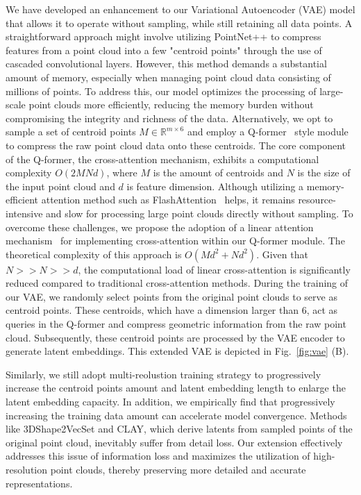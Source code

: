 We have developed an enhancement to our Variational Autoencoder (VAE) model that allows it to operate without sampling, while still retaining all data points. A straightforward approach might involve utilizing PointNet++ \cite{qi2017pointnet++} to compress features from a point cloud into a few "centroid points" through the use of cascaded convolutional layers. However, this method demands a substantial amount of memory, especially when managing point cloud data consisting of millions of points. To address this, our model optimizes the processing of large-scale point clouds more efficiently, reducing the memory burden without compromising the integrity and richness of the data.
Alternatively, we opt to sample a set of centroid points  $M \in \mathbb{R}^{m \times 6}$ and employ a Q-former~\cite{li2022blip} style module to compress the raw point cloud data onto these centroids. The core component of the Q-former, the cross-attention mechanism, exhibits a computational complexity $O(2MNd)$, where $M$ is the amount of centroids and $N$ is the size of the input point cloud and $d$ is feature dimension.
Although utilizing a memory-efficient attention method such as FlashAttention~\cite{dao2022flashattention} helps, it remains resource-intensive and slow for processing large point clouds directly without sampling. To overcome these challenges, we propose the adoption of a linear attention mechanism~\cite{qin2024various,qin2023transnormerllm} for implementing cross-attention within our Q-former module.
The theoretical complexity of this approach is $O(Md^2+Nd^2)$. 
Given that $N>>N>>d$, the computational load of linear cross-attention is significantly reduced compared to traditional cross-attention methods. During the training of our VAE, we randomly select points from the original point clouds to serve as centroid points. These centroids, which have a dimension larger than 6, act as queries in the Q-former and compress geometric information from the raw point cloud. Subsequently, these centroid points are processed by the VAE encoder to generate latent embeddings.
This extended VAE is depicted in Fig.~\ref{fig:vae} (B). 

Similarly, we still adopt multi-reolustion training strategy to progressively increase the centroid points amount and latent embedding length to enlarge the latent embedding capacity. 
In addition, we empirically find that progressively increasing the training data amount can accelerate model convergence.
Methods like 3DShape2VecSet and CLAY, which derive latents from sampled points of the original point cloud, inevitably suffer from detail loss. 
Our extension effectively addresses this issue of information loss and maximizes the utilization of high-resolution point clouds, thereby preserving more detailed and accurate representations.

